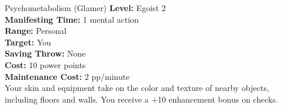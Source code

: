 {Psychometabolism (Glamer)}
{
	\textbf{Level:}
	Egoist 2\\
	\textbf{Manifesting Time:}
	1 mental action\\
	\textbf{Range:}
	Personal\\
	\textbf{Target:}
	You\\
	\textbf{Saving Throw:}
	None\\
	\textbf{Cost:}
	10 power points\\
	\textbf{Maintenance Cost:}
	2 pp/minute\\
}
{
	Your skin and equipment take on the color and texture of nearby objects, including floors and walls. You receive a +10 enhancement bonus on  checks.
}
